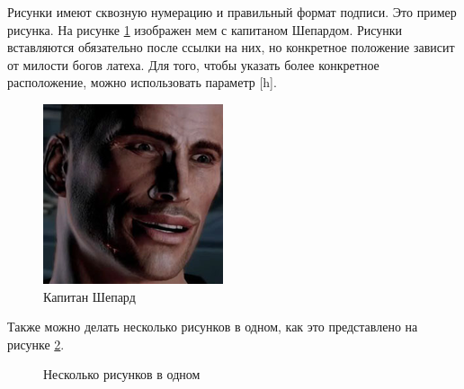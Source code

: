 Рисунки имеют сквозную нумерацию и правильный формат подписи. Это пример рисунка. На рисунке \ref{img:shepard}
 изображен мем с  капитаном Шепардом. Рисунки вставляются обязательно после ссылки на них, но конкретное положение
 зависит от милости богов латеха. Для того, чтобы указать более конкретное расположение, можно использовать параметр [h].
\begin{figure}[h]
	\centering
	\includegraphics{images/shepard}
	\caption{Капитан Шепард}
	\label{img:shepard}
\end{figure}

Также можно делать несколько рисунков в одном, как это представлено на рисунке \ref{img:multiple}.

\begin{figure}[h]
	\begin{minipage}[h]{0.5\linewidth}
	\end{minipage}
	\begin{minipage}[h]{0.5\linewidth}
	\end{minipage}
	\caption{Несколько рисунков в одном}
	\label{img:multiple}
\end{figure}

